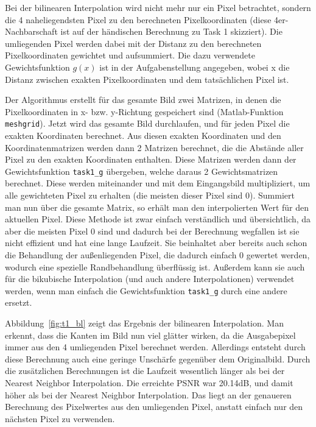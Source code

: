Bei der bilinearen Interpolation wird nicht mehr nur ein Pixel betrachtet, sondern die 4 naheliegendsten Pixel zu den berechneten Pixelkoordinaten (diese 4er-Nachbarschaft ist auf der händischen Berechnung zu Task 1 skizziert). Die umliegenden Pixel werden dabei mit der Distanz zu den berechneten Pixelkoordinaten gewichtet und aufsummiert. Die dazu verwendete Gewichtsfunktion $g(x)$ ist in der Aufgabenstellung angegeben, wobei x die Distanz zwischen exakten Pixelkoordinaten und dem tatsächlichen Pixel ist.

Der Algorithmus erstellt für das gesamte Bild zwei Matrizen, in denen die Pixelkoordinaten in x- bzw. y-Richtung gespeichert sind (Matlab-Funktion \texttt{meshgrid}). Jetzt wird das gesamte Bild durchlaufen, und für jeden Pixel die exakten Koordinaten berechnet. Aus diesen exakten Koordinaten und den Koordinatenmatrizen werden dann 2 Matrizen berechnet, die die Abstände aller Pixel zu den exakten Koordinaten enthalten. Diese Matrizen werden dann der Gewichtsfunktion \texttt{task1\_g} übergeben, welche daraus 2 Gewichtsmatrizen berechnet. Diese werden miteinander und mit dem Eingangsbild multipliziert, um alle gewichteten Pixel zu erhalten (die meisten dieser Pixel sind 0). Summiert man nun über die gesamte Matrix, so erhält man den interpolierten Wert für den aktuellen Pixel.
Diese Methode ist zwar einfach verständlich und übersichtlich, da aber die meisten Pixel 0 sind und dadurch bei der Berechnung wegfallen ist sie nicht effizient und hat eine lange Laufzeit. Sie beinhaltet aber bereits auch schon die Behandlung der außenliegenden Pixel, die dadurch einfach 0 gewertet werden, wodurch eine spezielle Randbehandlung überflüssig ist. Außerdem kann sie auch für die bikubische Interpolation (und auch andere Interpolationen) verwendet werden, wenn man einfach die Gewichtsfunktion \texttt{task1\_g} durch eine andere ersetzt.


\smallskip

Abbildung~\ref{fig:t1_bl} zeigt das Ergebnis der bilinearen Interpolation. Man erkennt, dass die Kanten im Bild nun viel glätter wirken, da die Ausgabepixel immer aus den 4 umliegenden Pixel berechnet werden. Allerdings entsteht durch diese Berechnung auch eine geringe Unschärfe gegenüber dem Originalbild. Durch die zusätzlichen Berechnungen ist die Laufzeit wesentlich länger als bei der Nearest Neighbor Interpolation. Die erreichte PSNR war 20.14dB, und damit höher als bei der Nearest Neighbor Interpolation. Das liegt an der genaueren Berechnung des Pixelwertes aus den umliegenden Pixel, anstatt einfach nur den nächsten Pixel zu verwenden.

